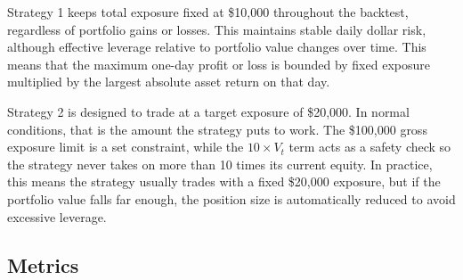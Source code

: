 \documentclass[10pt,a4paper]{article}
\begin{document}
Strategy 1 keeps total exposure fixed at \$10,000 throughout the backtest, regardless of portfolio gains or losses. This maintains stable daily dollar risk, although effective leverage relative to portfolio value changes over time. This means that the maximum one-day profit or loss is bounded by fixed exposure multiplied by the largest absolute asset return on that day.

Strategy 2 is designed to trade at a target exposure of \$20,000. In normal conditions, that is the amount the strategy puts to work. The \$100,000 gross exposure limit is a set constraint, while the $10 \times V_t$ term acts as a safety check so the strategy never takes on more than 10 times its current equity. In practice, this means the strategy usually trades with a fixed \$20,000 exposure, but if the portfolio value falls far enough, the position size is automatically reduced to avoid excessive leverage.

\clearpage
\subsection{Metrics}
\end{document}
